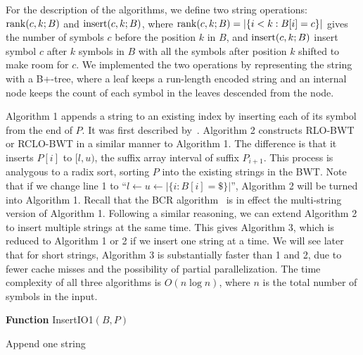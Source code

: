 \documentclass{bioinfo}
\begin{document}
\begin{methods}
For the description of the algorithms, we define two string operations: ${\rm
rank}(c,k;B)$ and ${\rm insert}(c,k;B)$, where ${\rm
rank}(c,k;B)=|\{i<k:B[i]=c\}|$ gives the number of symbols $c$ before the
position $k$ in $B$, and ${\rm insert}(c,k;B)$ insert symbol $c$ after $k$
symbols in $B$ with all the symbols after position $k$ shifted to make room for
$c$. We implemented the two operations by representing the string with a
B+-tree, where a leaf keeps a run-length encoded string and an internal node
keeps the count of each symbol in the leaves descended from the node.

Algorithm 1 appends a string to an existing index by inserting each of its
symbol from the end of $P$. It was first described
by~\citet{DBLP:conf/cpm/ChanHL04}. Algorithm 2 constructs RLO-BWT or RCLO-BWT
in a similar manner to Algorithm 1. The difference is that it inserts $P[i]$ to
$[l,u)$, the suffix array interval of suffix $P_{i+1}$. This process is
analygous to a radix sort, sorting $P$ into the existing strings in the BWT.
Note that if we change line 1 to ``\mbox{$l\gets u\gets|\{i:B[i]=\$\}|$}'',
Algorithm 2 will be turned into Algorithm 1. Recall that the BCR
algorithm~\citep{DBLP:journals/tcs/BauerCR13} is in effect the multi-string
version of Algorithm 1. Following a similar reasoning, we can extend Algorithm
2 to insert multiple strings at the same time. This gives Algorithm 3, which is
reduced to Algorithm 1 or 2 if we insert one string at a time. We will see
later that for short strings, Algorithm 3 is substantially faster than
1 and 2, due to fewer cache misses and the possibility of partial parallelization.
The time complexity of all three algorithms is $O(n\log n)$, where
$n$ is the total number of symbols in the input.

\begin{algorithm}[ht]
\DontPrintSemicolon
\footnotesize
{}
\BlankLine
\textbf{Function} {\sc InsertIO1}$(B,P)$
\caption{Append one string}
\end{algorithm}


\end{methods}
\end{document}
